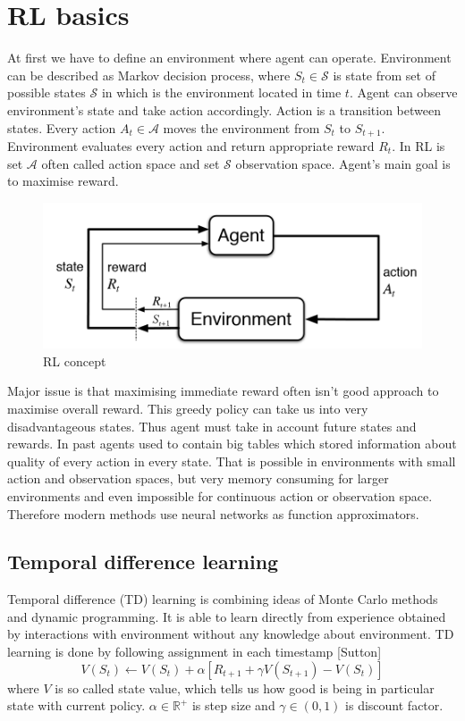 \chapter{RL basics}
At first we have to define an environment where agent can operate. Environment can be described as Markov decision process, where $S_t \in \mathcal{S}$ is state from set of possible states $\mathcal{S}$ in which is the environment located in time $t$. Agent can observe environment's state and take action accordingly. Action is a transition between states. Every action $A_t \in \mathcal{A}$ moves the environment from $S_t$ to $S_{t+1}$. Environment evaluates every action and return appropriate reward $R_t$. In RL is set $\mathcal{A}$ often called action space and set $\mathcal{S}$ observation space. Agent's main goal is to maximise reward.

\begin{figure}[!h]
\includegraphics[scale=0.3]{images/RL-concept.png}
\caption{RL concept}
\end{figure}

Major issue is that maximising immediate reward often isn't good approach to maximise overall reward. This greedy policy can take us into very disadvantageous states. Thus agent must take in account future states and rewards. In past agents used to contain big tables which stored information about quality of every action in every state. That is possible in environments with small action and observation spaces, but very memory consuming for larger environments and even impossible for continuous action or observation space. Therefore modern methods use neural networks as function approximators.

\section{Temporal difference learning}
Temporal difference (TD) learning is combining ideas of Monte Carlo methods and dynamic programming. It is able to learn directly from experience obtained by interactions with environment without any knowledge about environment. TD learning is done by following assignment in each timestamp [Sutton]
\begin{equation}
V(S_t) \gets V(S_t) + \alpha [R_{t+1} + \gamma V(S_{t+1}) - V(S_t)]
\end{equation}
where $V$ is so called state value, which tells us how good is being in particular state with current policy. $\alpha \in \mathbb{R}^+$ is step size and $\gamma \in (0, 1)$ is discount factor.

